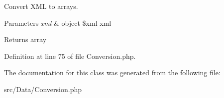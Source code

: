 Convert X\+ML to arrays.


\begin{DoxyParams}{Parameters}
{\em xml} & object \$xml xml\\
\hline
\end{DoxyParams}
\begin{DoxyReturn}{Returns}
array 
\end{DoxyReturn}


Definition at line 75 of file Conversion.\+php.



The documentation for this class was generated from the following file\+:\begin{DoxyCompactItemize}
\item 
src/\+Data/Conversion.\+php\end{DoxyCompactItemize}
